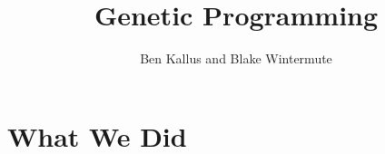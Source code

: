 \documentclass[12pt]{article}
\title{Genetic Programming}
\author{Ben Kallus and Blake Wintermute}
\date{ }
\begin{document}
\pagecolor{black}
\color{white}
\maketitle

\section*{What We Did}
\end{document}
